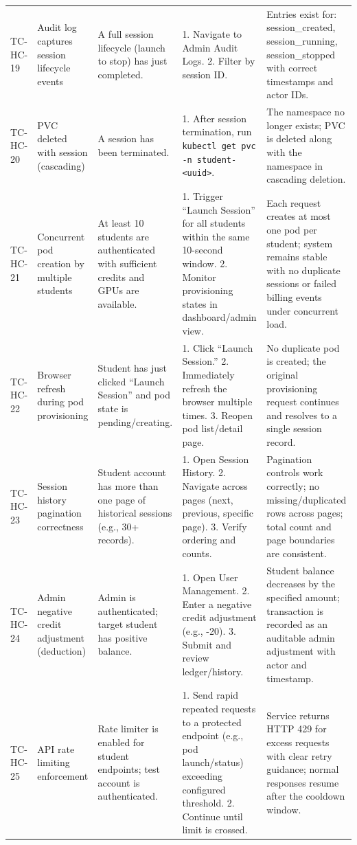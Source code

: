 \documentclass[12pt,a4paper]{article}
\begin{document}
\begin{longtable}{@{}L{2cm}L{3cm}L{3cm}L{3.5cm}L{3cm}@{}}
  TC-HC-19 & Audit log captures session lifecycle events & A full session lifecycle (launch to stop) has just completed. & 1. Navigate to Admin Audit Logs. 2. Filter by session ID. & Entries exist for: session\_created, session\_running, session\_stopped with correct timestamps and actor IDs. \\
    TC-HC-20 & PVC deleted with session (cascading) & A session has been terminated. & 1. After session termination, run \texttt{kubectl get pvc -n student-<uuid>}. & The namespace no longer exists; PVC is deleted along with the namespace in cascading deletion. \\
  TC-HC-21 & Concurrent pod creation by multiple students & At least 10 students are authenticated with sufficient credits and GPUs are available. & 1. Trigger ``Launch Session'' for all students within the same 10-second window. 2. Monitor provisioning states in dashboard/admin view. & Each request creates at most one pod per student; system remains stable with no duplicate sessions or failed billing events under concurrent load. \\
    TC-HC-22 & Browser refresh during pod provisioning & Student has just clicked ``Launch Session'' and pod state is pending/creating. & 1. Click ``Launch Session.'' 2. Immediately refresh the browser multiple times. 3. Reopen pod list/detail page. & No duplicate pod is created; the original provisioning request continues and resolves to a single session record. \\
  TC-HC-23 & Session history pagination correctness & Student account has more than one page of historical sessions (e.g., 30+ records). & 1. Open Session History. 2. Navigate across pages (next, previous, specific page). 3. Verify ordering and counts. & Pagination controls work correctly; no missing/duplicated rows across pages; total count and page boundaries are consistent. \\
    TC-HC-24 & Admin negative credit adjustment (deduction) & Admin is authenticated; target student has positive balance. & 1. Open User Management. 2. Enter a negative credit adjustment (e.g., -20). 3. Submit and review ledger/history. & Student balance decreases by the specified amount; transaction is recorded as an auditable admin adjustment with actor and timestamp. \\
  TC-HC-25 & API rate limiting enforcement & Rate limiter is enabled for student endpoints; test account is authenticated. & 1. Send rapid repeated requests to a protected endpoint (e.g., pod launch/status) exceeding configured threshold. 2. Continue until limit is crossed. & Service returns HTTP 429 for excess requests with clear retry guidance; normal responses resume after the cooldown window. \\

\end{longtable}
\end{document}
